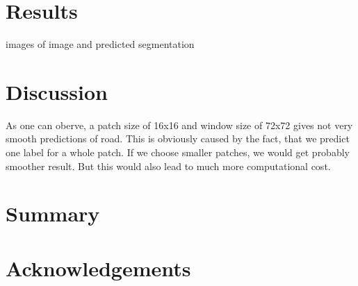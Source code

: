 \documentclass[10pt,conference,compsocconf]{IEEEtran}
\begin{document}
\section{Results}

images of image and predicted segmentation


\section{Discussion}


As one can oberve, a patch size of 16x16 and window size of 72x72 gives not very smooth predictions of road. This is obviously caused by the fact, that we predict one label for a whole patch. If we choose smaller patches, we would get probably smoother result. But this would also lead to much more computational cost.


\section{Summary}




\section*{Acknowledgements}




\end{document}
